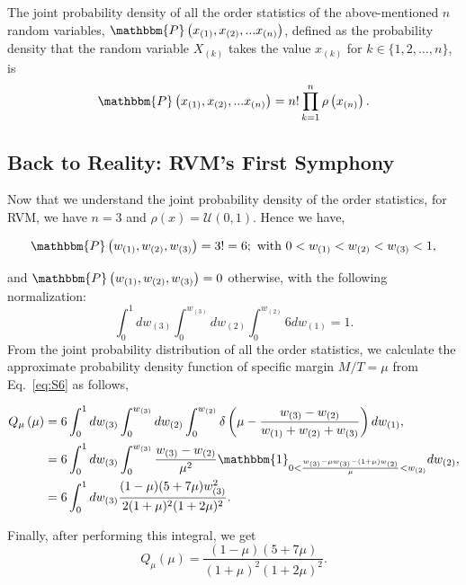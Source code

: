 The joint probability density of all the order statistics of the above-mentioned $n$ random variables, $\mathbbm{P}\left(x_{(1)}, x_{(2)}, ... x_{(n)}\right)$, defined as the probability density that the random variable $X_{(k)}$ takes the value $x_{(k)}$ for $k \in \{ 1, 2, \dots, n\}$, is
\begin{equation}
    \mathbbm{P}\left(x_{(1)}, x_{(2)}, ... x_{(n)}\right) = n!\prod_{k=1}^{n}\rho\left(x_{(n)}\right).
\end{equation}
\subsection{Back to Reality: RVM's First Symphony}
Now that we understand the joint probability density of the order statistics, for RVM, we have $n = 3$ and $\rho(x) = \mathcal{U}(0, 1)$. Hence we have,    
\begin{center}
    \begin{align}
        \mathbbm{P}\left(w_{(1)}, w_{(2)}, w_{(3)}\right) = 3! = 6; \text{ with } 0<w_{(1)}<w_{(2)}<w_{(3)}<1,
    \end{align}
\end{center}
and $\mathbbm{P}\left(w_{(1)}, w_{(2)}, w_{(3)}\right) = 0$ otherwise, with the following normalization:
\begin{equation}
    \int_{0}^{1}dw_{(3)}\int_{0}^{w_{(3)}}dw_{(2)}\int_{0}^{w_{(2)}} 6 dw_{(1)} = 1.
\end{equation}
From the joint probability distribution of all the order statistics, we calculate the approximate probability density function of specific margin $ M / T = \mu$ from Eq.~\eqref{eq:S6} as follows, 
\begin{center}
    \begin{align}
        \nonumber Q_{\mu}\left(\mu\right) & = 6 \nonumber \int_{0}^{1}dw_{(3)}\int_{0}^{w_{(3)}}dw_{(2)}\int_{0}^{w_{(2)}} \delta\left(\mu - \frac{w_{(3)}- w_{(2)}}{w_{(1)} + w_{(2)} + w_{(3)}}\right)dw_{(1)},\\
        & = 6 \int_{0}^{1}dw_{(3)}\int_{0}^{w_{(3)}} \frac{w_{(3)} - w_{(2)}}{\mu^2} \nonumber \mathbbm{1}_{0<\frac{w_{(3)} - \mu w_{(3)} - (1 + \mu)w_{(2)}}{\mu}<w_{(2)}} dw_{(2)},\\
        & = 6 \int_{0}^{1}dw_{(3)} \frac{(1 - \mu)(5 + 7\mu)w_{(3)}^2}{2(1 + \mu)^2(1 + 2\mu)^2}.\\
    \end{align}
\end{center}
Finally, after performing this integral, we get 
\begin{equation}
    Q_{\mu}\left(\mu\right) = \frac{(1 - \mu)(5 + 7\mu)}{(1 + \mu)^2(1 + 2\mu)^2}.
\end{equation}
